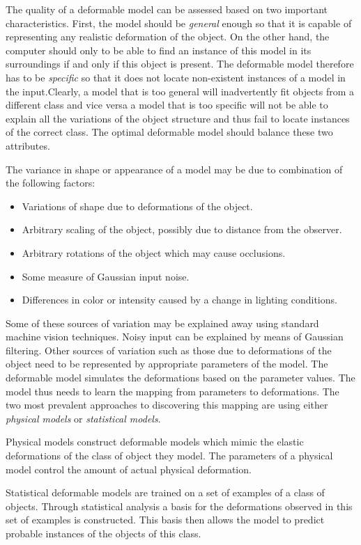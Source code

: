 \documentclass[11pt,a4paper]{report}
\begin{document}
The quality of a deformable model can be assessed based on two important
characteristics. First, the model should be \textit{general} enough so that it
is capable of representing any realistic deformation of the object.
On the other hand, the computer should only to be able to find an instance of this
model in its surroundings if and only if this object is present. The deformable model
therefore has to be \textit{specific} so that it does not locate non-existent
instances of a model in the input.Clearly, a model that is too general will inadvertently fit objects from a
different class and vice versa a model that is too specific will not be able to
explain all the variations of the object structure and thus fail to locate
instances of the correct class. The optimal deformable model should balance these two
attributes.

The variance in shape or appearance of a model may be due to combination of the following
factors:
\begin{itemize}
\item Variations of shape due to deformations of the object.
\item Arbitrary scaling of the object, possibly due to distance from the observer.
\item Arbitrary rotations of the object which may cause occlusions. 
\item Some measure of Gaussian input noise.
\item Differences in color or intensity caused by a change in lighting conditions.
\end{itemize}
Some of these sources of variation may be explained away using standard machine
vision techniques. Noisy input can be explained by means of Gaussian
filtering. Other sources of variation such as those due to deformations of the
object need to be represented by appropriate parameters of the model. The
deformable model simulates the deformations based on the parameter values. The
model thus needs to learn the mapping from parameters to deformations. The two
most prevalent approaches to discovering this mapping are using either \textit{physical
models} or \textit{statistical models}.

Physical models construct deformable models which mimic the elastic deformations
of the class of object they model. The parameters of a physical model control the amount
of actual physical deformation.

Statistical deformable models are trained on a set of examples of a class of
objects. Through statistical analysis a basis for the deformations observed in
this set of examples is constructed. This basis then allows the model to predict
probable instances of the objects of this class.
\end{document}

